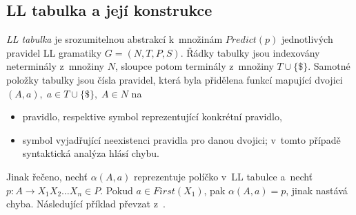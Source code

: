 \subsection*{LL tabulka a její konstrukce}
\emph{LL tabulka} je srozumitelnou abstrakcí k~množinám $Predict(p)$ jednotlivých pravidel LL gramatiky $G = (N, T, P, S)$.
Řádky tabulky jsou indexovány neterminály z~množiny $N$, sloupce potom terminály z~množiny $T \cup \{\$\}$.
Samotné položky tabulky jsou čísla pravidel, která byla přidělena funkcí mapující dvojici $(A, a),\; a \in T \cup \{\$\},\; A \in N$ na 
\begin{itemize}
    \item pravidlo, respektive symbol reprezentující konkrétní pravidlo,
    \item symbol vyjadřující neexistenci pravidla pro danou dvojici; v~tomto případě syntaktická analýza hlásí chybu.
\end{itemize}
Jinak řečeno, nechť $\alpha(A, a)$ reprezentuje políčko v~LL tabulce a~nechť $p: A \rightarrow X_1X_2\ldots X_n \in P$.
Pokud $a \in First(X_1)$, pak $\alpha(A, a) = p$, jinak nastává chyba.
Následující příklad převzat z~\cite{medunaElementsOfCompDesign}.
